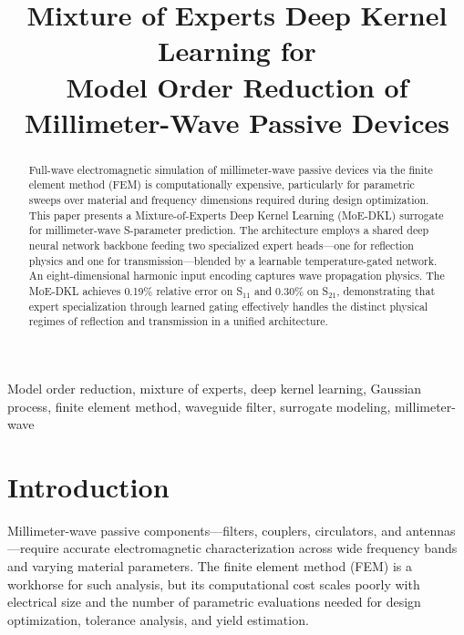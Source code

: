 \documentclass[conference]{IEEEtran}
\begin{document}
\title{Mixture of Experts Deep Kernel Learning for\\
Model Order Reduction of\\
Millimeter-Wave Passive Devices}
\author{
}

\maketitle

\begin{abstract}
Full-wave electromagnetic simulation of millimeter-wave passive devices via the finite element method (FEM) is computationally expensive, particularly for parametric sweeps over material and frequency dimensions required during design optimization. This paper presents a Mixture-of-Experts Deep Kernel Learning (MoE-DKL) surrogate for millimeter-wave S-parameter prediction. The architecture employs a shared deep neural network backbone feeding two specialized expert heads---one for reflection physics and one for transmission---blended by a learnable temperature-gated network. An eight-dimensional harmonic input encoding captures wave propagation physics. The MoE-DKL achieves 0.19\% relative error on S$_{11}$ and 0.30\% on S$_{21}$, demonstrating that expert specialization through learned gating effectively handles the distinct physical regimes of reflection and transmission in a unified architecture.
\end{abstract}

\begin{IEEEkeywords}
Model order reduction, mixture of experts, deep kernel learning, Gaussian process, finite element method, waveguide filter, surrogate modeling, millimeter-wave
\end{IEEEkeywords}

\section{Introduction}

Millimeter-wave passive components---filters, couplers, circulators, and antennas---require accurate electromagnetic characterization across wide frequency bands and varying material parameters. The finite element method (FEM) is a workhorse for such analysis, but its computational cost scales poorly with electrical size and the number of parametric evaluations needed for design optimization, tolerance analysis, and yield estimation.
\end{document}
